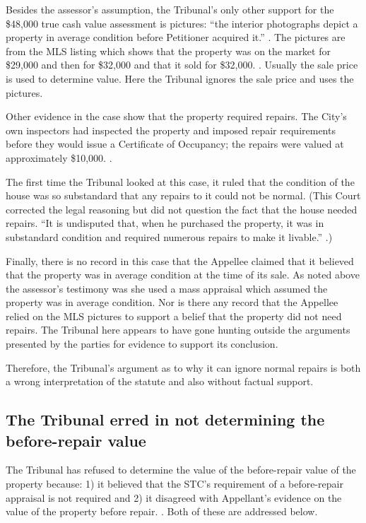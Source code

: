 \documentclass[12pt,\documentclassflag]{michiganCourtOfAppealsBrief}
\begin{document}
Besides the assessor's assumption, the Tribunal's only other support for the \$48,000 true cash value assessment is pictures: ``the interior photographs depict a property in average condition before Petitioner acquired it.'' \reconsiderationDenied[2]. The pictures are from the MLS listing which shows that the property was on the market for \$29,000 and then for \$32,000 and that it sold for \$32,000. \mlsHistory[]. Usually the sale price is used to determine value. Here the Tribunal ignores the sale price and uses the pictures.

Other evidence in the case show that the property required repairs. The City's own inspectors had inspected the property and imposed repair requirements before they would issue a Certificate of Occupancy; the repairs were valued at approximately \$10,000. \repairs. 

The first time the Tribunal looked at this case, it ruled that the condition of the house was so substandard that any repairs to it could not be normal. (This Court corrected the legal reasoning but did not question the fact that the house needed repairs. ``It is undisputed that, when he purchased the property, it was in substandard condition and required numerous repairs to make it livable.'' .)

Finally, there is no record in this case that the Appellee claimed that it believed that the property was in average condition at the time of its sale. As noted above the assessor's testimony was she used a mass appraisal which assumed the property was in average condition. Nor is there any record that the Appellee relied on the MLS pictures to support a belief that the property did not need repairs. The Tribunal here appears to have gone hunting outside the arguments presented by the parties for evidence to support its conclusion.

Therefore, the Tribunal's argument as to why it can ignore normal repairs is both a wrong interpretation of the statute and also without factual support.

\subsection{The Tribunal erred in not determining the before-repair value}

The Tribunal has refused to determine the value of the before-repair value of the property because:
1) it believed that the STC's requirement of a before-repair appraisal is not required
and
2) it disagreed with Appellant's evidence on the value of the property before repair.
\reconsiderationDenied[2]. Both of these are addressed below.
\end{document}
